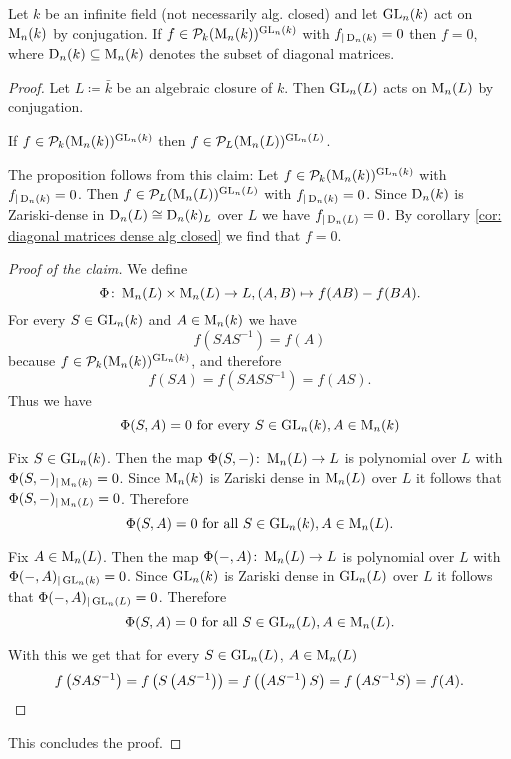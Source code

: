 \begin{prop}
  Let $k$ be an infinite field (not necessarily alg. closed) and let $\operatorname{GL}_n(k)$ act on $\operatorname{M}_n(k)$ by conjugation.
  If $f \in \mathcal{P}_k(\operatorname{M}_n(k))^{\operatorname{GL}_n(k)}$ with $f_{|\operatorname{D}_n(k)} = 0$ then $f = 0$, where $\operatorname{D}_n(k) \subseteq \operatorname{M}_n(k)$ denotes the subset of diagonal matrices.
\end{prop}
\begin{proof}
  Let $L \coloneqq \bar{k}$ be an algebraic closure of $k$.
  Then $\operatorname{GL}_n(L)$ acts on $\operatorname{M}_n(L)$ by conjugation.
  
  \begin{claim}
    If $f \in \mathcal{P}_k(\operatorname{M}_n(k))^{\operatorname{GL}_n(k)}$ then $f \in \mathcal{P}_L(\operatorname{M}_n(L))^{\operatorname{GL}_n(L)}$.
  \end{claim}
  
  The proposition follows from this claim:
  Let $f \in \mathcal{P}_k(\operatorname{M}_n(k))^{\operatorname{GL}_n(k)}$ with $f_{|\operatorname{D}_n(k)} = 0$.
  Then $f \in \mathcal{P}_L(\operatorname{M}_n(L))^{\operatorname{GL}_n(L)}$ with $f_{|\operatorname{D}_n(k)} = 0$.
  Since $\operatorname{D}_n(k)$ is Zariski-dense in $\operatorname{D}_n(L) \cong \operatorname{D}_n(k)_L$ over $L$ we have $f_{|\operatorname{D}_n(L)} = 0$.
  By corollary \ref{cor: diagonal matrices dense alg closed} we find that $f = 0$.
  
  \begin{proof}[Proof of the claim]
    We define
    \[
              \Phi
      \colon  \operatorname{M}_n(L) \times \operatorname{M}_n(L)
      \to     L,
              (A,B)
      \mapsto f(AB)-f(BA).
    \]
    For every $S \in \operatorname{GL}_n(k)$ and $A \in \operatorname{M}_n(k)$ we have
    \[
        f\left( SAS^{-1} \right)
      = f(A)
    \]
    because $f \in \mathcal{P}_k(\operatorname{M}_n(k))^{\operatorname{GL}_n(k)}$, and therefore
    \[
        f(SA)
      = f\left (SASS^{-1} \right)
      = f(AS).
    \]
    Thus we have
    \[
        \Phi(S,A)
      = 0
      \text{ for every }
      S \in \operatorname{GL}_n(k),
      A \in \operatorname{M}_n(k)
    \]
    
    Fix $S \in \operatorname{GL}_n(k)$.
    Then the map $\Phi(S, -) \colon \operatorname{M}_n(L) \to L$ is polynomial over $L$ with $\Phi(S,-)_{|\operatorname{M}_n(k)} = 0$.
    Since $\operatorname{M}_n(k)$ is Zariski dense in $\operatorname{M}_n(L)$ over $L$ it follows that $\Phi(S,-)_{|\operatorname{M}_n(L)} = 0$.
    Therefore
    \[
        \Phi(S,A)
      = 0
      \text{ for all }
      S \in \operatorname{GL}_n(k),
      A \in \operatorname{M}_n(L).
    \]
    
    Fix $A \in \operatorname{M}_n(L)$.
    Then the map $\Phi(-,A) \colon \operatorname{M}_n(L) \to L$ is polynomial over $L$ with $\Phi(-,A)_{|\operatorname{GL}_n(k)} = 0$.
    Since $\operatorname{GL}_n(k)$ is Zariski dense in $\operatorname{GL}_n(L)$ over $L$ it follows that $\Phi(-,A)_{|\operatorname{GL}_n(L)} = 0$.
    Therefore
    \[
        \Phi(S,A)
      = 0
      \text{ for all }
      S \in \operatorname{GL}_n(L),
      A \in \operatorname{M}_n(L).
    \]
    
    With this we get that for every $S \in \operatorname{GL}_n(L)$, $A \in \operatorname{M}_n(L)$
    \[
        f\left( SAS^{-1} \right)
      = f\left( S \left( AS^{-1} \right) \right)
      = f\left( \left( AS^{-1} \right) S \right)
      = f\left( AS^{-1}S \right)
      = f(A).
      \qedhere
    \]
  \end{proof}
  
  This concludes the proof.
\end{proof}





